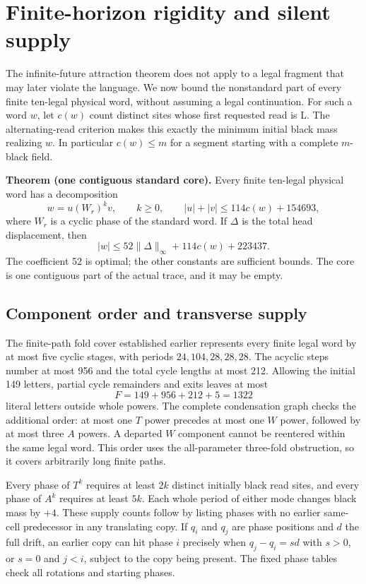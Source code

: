 \section{Finite-horizon rigidity and silent supply}\label{sec:silent-supply}
The infinite-future attraction theorem does not apply to a legal fragment that
may later violate the language. We now bound the nonstandard part of every
finite ten-legal physical word, without assuming a legal continuation.
For such a word $w$, let $c(w)$ count distinct sites whose first requested read
is L. The alternating-read criterion makes this exactly the minimum initial
black mass realizing $w$. In particular $c(w)\le m$ for a segment starting
with a complete $m$-black field.

\textbf{Theorem (one contiguous standard core).}
Every finite ten-legal physical word has a decomposition
\[
 w=u(W_r)^k v,\qquad k\ge0,\qquad
 |u|+|v|\le114c(w)+154693,
\]
where $W_r$ is a cyclic phase of the standard word. If $\Delta$ is the total
head displacement, then
\begin{equation}\label{eq:silent-supply}
 |w|\le52\|\Delta\|_\infty+114c(w)+223437.
\end{equation}
The coefficient 52 is optimal; the other constants are sufficient bounds.
The core is one contiguous part of the actual trace, and it may be empty.

\subsection{Component order and transverse supply}
The finite-path fold cover established earlier represents every finite legal
word by at most five cyclic stages, with periods $24,104,28,28,28$.
The acyclic steps number at most 956 and the total cycle lengths at most 212.
Allowing the initial 149 letters, partial cycle remainders and exits leaves
at most
\[
 F=149+956+212+5=1322
\]
literal letters outside whole powers. The complete condensation graph checks
the additional order: at most one $T$ power precedes at most one $W$ power,
followed by at most three $A$ powers. A departed $W$ component cannot be
reentered within the same legal word. This order uses the all-parameter
three-fold obstruction, so it covers arbitrarily long finite paths.

Every phase of $T^k$ requires at least $2k$ distinct initially black read
sites, and every phase of $A^k$ requires at least $5k$. Each whole period
of either mode changes black mass by $+4$. These supply counts follow by
listing phases with no earlier same-cell predecessor in any translating
copy. If $q_i$ and $q_j$ are phase positions and $d$ the full drift,
an earlier copy can hit phase $i$ precisely when $q_j-q_i=s d$ with
$s>0$, or $s=0$ and $j<i$, subject to the copy being present.
The fixed phase tables check all rotations and starting phases.


